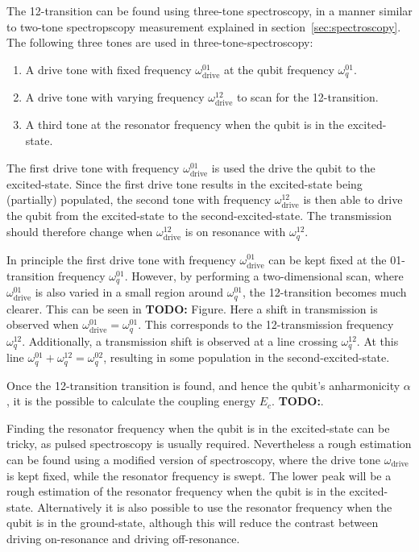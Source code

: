         The 12-transition can be found using three-tone spectroscopy, in a manner similar to two-tone spectropscopy measurement explained in section~\ref{sec:spectroscopy}. The following three tones are used in three-tone-spectroscopy:

        \begin{enumerate}
          \item A drive tone with fixed frequency $\omega_\text{drive}^{01}$ at the qubit frequency $\omega_q^{01}$.
          \item A drive tone with varying frequency $\omega_\text{drive}^{12}$ to scan for the 12-transition.
          \item A third tone at the resonator frequency when the qubit is in the excited-state.
        \end{enumerate}

        The first drive tone with frequency $\omega_\text{drive}^{01}$ is used the drive the qubit to the excited-state. Since the first drive tone results in the excited-state being (partially) populated, the second tone with frequency $\omega_\text{drive}^{12}$ is then able to drive the qubit from the excited-state to the second-excited-state. The transmission should therefore change when $\omega_\text{drive}^{12}$ is on resonance with $\omega_q^{12}$.

        In principle the first drive tone with frequency $\omega_\text{drive}^{01}$ can be kept fixed at the 01-transition frequency $\omega_q^{01}$. However, by performing a two-dimensional scan, where $\omega_\text{drive}^{01}$ is also varied in a small region around $\omega_q^{01}$, the 12-transition becomes much clearer. This can be seen in \textbf{TODO:} Figure. Here a shift in transmission is observed when $\omega_\text{drive}^{01} = \omega_q^{01}$. This corresponds to the 12-transmission frequency $\omega_q^{12}$. Additionally, a transmission shift is observed at a line crossing $\omega_q^{12}$. At this line $\omega_q^{01} + \omega_q^{12} = \omega_q^{02}$, resulting in some population in the second-excited-state.

        Once the 12-transition transition is found, and hence the qubit's anharmonicity $\alpha$, it is the possible to calculate the coupling energy $E_c$. \textbf{TODO:}.

        Finding the resonator frequency when the qubit is in the excited-state can be tricky, as pulsed spectroscopy is usually required. Nevertheless a rough estimation can be found using a modified version of spectroscopy, where the drive tone $\omega_\text{drive}$ is kept fixed, while the resonator frequency is swept. The lower peak will be a rough estimation of the resonator frequency when the qubit is in the excited-state. Alternatively it is also possible to use the resonator frequency when the qubit is in the ground-state, although this will reduce the contrast between driving on-resonance and driving off-resonance.


